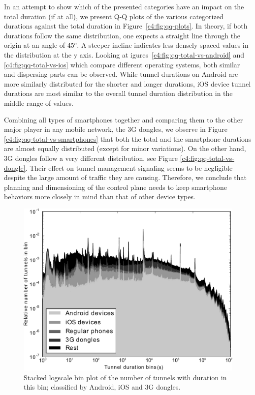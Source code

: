 In an attempt to show which of the presented categories have an impact on the total duration (if at all), we present Q-Q plots of the various categorized durations against the total duration in Figure~\ref{c4:fig:qq-plots}. In theory, if both durations follow the same distribution, one expects a straight line through the origin at an angle of 45$^o$. A steeper incline indicates less densely spaced values in the distribution at the y axis. Looking at igures~\ref{c4:fig:qq-total-vs-android} and \ref{c4:fig:qq-total-vs-ios} which compare different operating systems, both similar and dispersing parts can be observed. While tunnel durations on Android  are more similarly distributed for the shorter and longer durations, iOS device tunnel durations are most similar to the overall tunnel duration distribution in the middle range of values.

Combining all types of smartphones together and comparing them to the other major player in any mobile network, the 3G dongles, we observe in Figure \ref{c4:fig:qq-total-vs-smartphones} that both the total and the smartphone durations are almost equally distributed (except for minor variations). On the other hand, 3G dongles follow a very different distribution, see Figure \ref{c4:fig:qq-total-vs-dongle}. Their effect on tunnel management signaling seems to be negligible despite the  large amount of traffic they are causing. Therefore, we conclude that planning and dimensioning of the control plane needs to keep smartphone behaviors more closely in mind than that of other device types.


\begin{figure}[htb]
	\centering
	\includegraphics[width=1.0\textwidth]{images/stacked-durations-2-fixed.pdf}
	\caption{Stacked logscale bin plot of the number of tunnels with duration in this bin; classified by Android, iOS and 3G dongles.}
	\label{c4:fig:stacked-durations}
\end{figure}

